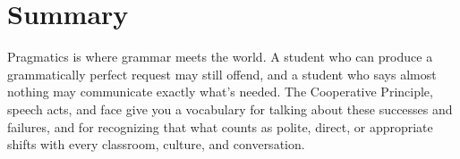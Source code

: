 \section{Summary}

Pragmatics is where grammar meets the world. A student who can produce a grammatically perfect request may still offend, and a student who says almost nothing may communicate exactly what's needed. The Cooperative Principle, speech acts, and face give you a vocabulary for talking about these successes and failures, and for recognizing that what counts as polite, direct, or appropriate shifts with every classroom, culture, and conversation.
